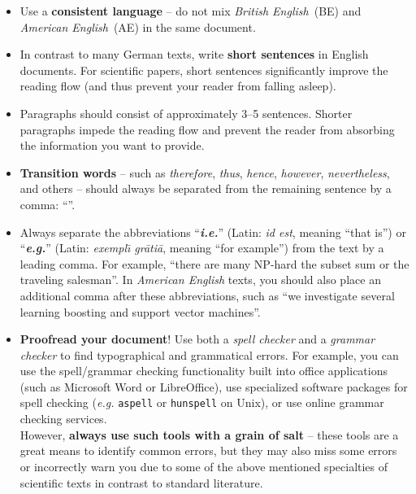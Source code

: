 \documentclass[11pt,a4paper]{article}
\begin{document}
\begin{itemize}

\item Use a \textbf{consistent language} -- do not mix \emph{British English}~(BE) and \emph{American English}~(AE) in the same document. 
 
\item In contrast to many German texts, write \textbf{short sentences} in 
English documents. For scientific papers, short sentences significantly improve 
the reading flow (and thus prevent your reader from falling asleep).
 
\item Paragraphs should consist of approximately 3--5 sentences. Shorter paragraphs impede the reading flow and prevent the reader from absorbing the information you want to provide.
 
\item \textbf{Transition words} -- such as \emph{therefore}, \emph{thus}, \emph{hence}, \emph{however}, \emph{nevertheless}, and others -- should always be separated from the remaining sentence by a comma: ``''.
 
\item Always separate the abbreviations ``\textbf{\emph{i.e.}}'' (Latin: \emph{id est}, meaning ``that is'') or ``\textbf{\emph{e.g.}}'' (Latin: \emph{exempl\={\i} gr\={a}ti\={a}}, meaning ``for example'') from the text by a leading comma. For example, ``there are many NP-hard  the subset sum or the traveling salesman''. In \emph{American English} texts, you should also place an additional comma after these abbreviations, such as ``we investigate several learning  boosting and support vector machines''.
 


 \item \textbf{Proofread your document}! Use both a \emph{spell checker} and a \emph{grammar checker} to find typographical and grammatical errors.
 For example, you can use the spell/grammar checking functionality built into office applications (such as Microsoft Word or LibreOffice), use specialized software packages for spell checking (\emph{e.g.} \texttt{aspell} or \texttt{hunspell} on Unix), or use online grammar checking services.\\
 However, \textbf{always use such tools with a grain of salt} -- these tools are a great means to identify common errors, but they may also miss some errors or incorrectly warn you due to some of the above mentioned specialties of scientific texts in contrast to standard literature.
% 
\end{itemize}
\end{document}

